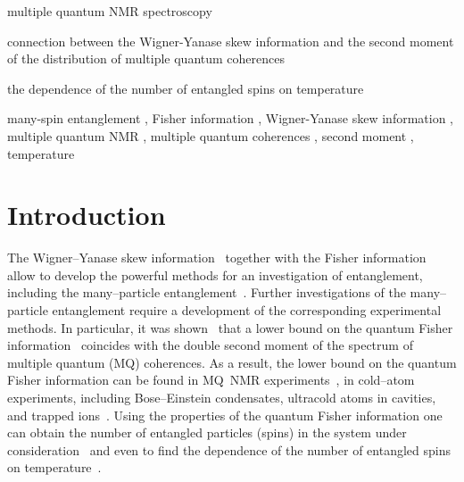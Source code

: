 \documentclass[preprint,12pt]{elsarticle}
\begin{document}
\begin{frontmatter}

\begin{highlights}
	\item multiple quantum NMR spectroscopy
	\item connection between the Wigner-Yanase skew information and the second moment of the distribution of multiple quantum coherences
	\item the dependence of the number of entangled spins on temperature
\end{highlights}

\begin{keyword}
	many-spin entanglement \sep
	Fisher information \sep
	Wigner-Yanase skew information \sep
	multiple quantum NMR \sep
	multiple quantum coherences \sep
	second moment \sep
	temperature
\end{keyword}

\end{frontmatter}

\linenumbers


\section{Introduction}
\label{sec:1}
The Wigner--Yanase skew information~\cite{1,2,3,4} together with the Fisher information~\cite{5,6} allow to develop the powerful methods for an investigation of entanglement, including the many--particle entanglement~\cite{7,8}.
Further investigations of the many--particle entanglement require a development of the corresponding experimental methods.
In particular, it was shown~\cite{7,9} that a lower bound on the quantum Fisher information~\cite{5,6} coincides with the double second moment of the spectrum of multiple quantum (MQ) coherences.
As a result, the lower bound on the quantum Fisher information can be found in MQ~NMR experiments~\cite{10},
in cold--atom experiments, including Bose--Einstein condensates, ultracold atoms in cavities, and trapped ions~\cite{11,12,13,14,15}.
Using the properties of the quantum Fisher information one can obtain the number of entangled particles (spins) in the system under consideration~\cite{7}
and even to find the dependence of the number of entangled spins on temperature~\cite{9}.
\end{document}

